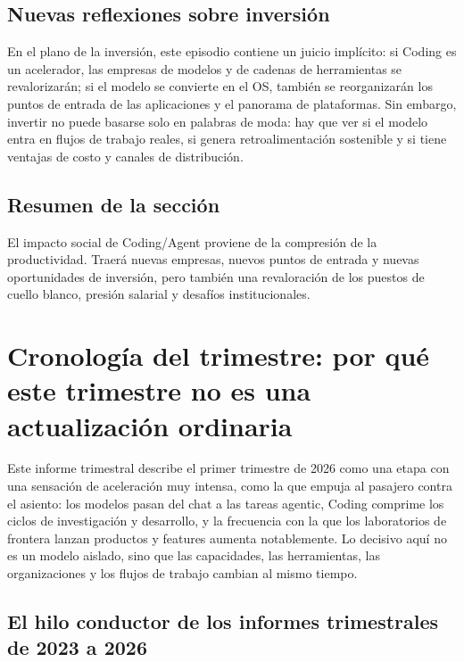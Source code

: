 \documentclass[a4paper]{article}
\begin{document}
\subsection{Nuevas reflexiones sobre inversión}

En el plano de la inversión, este episodio contiene un juicio implícito: si Coding es un acelerador, las empresas de modelos y de cadenas de herramientas se revalorizarán; si el modelo se convierte en el OS, también se reorganizarán los puntos de entrada de las aplicaciones y el panorama de plataformas. Sin embargo, invertir no puede basarse solo en palabras de moda: hay que ver si el modelo entra en flujos de trabajo reales, si genera retroalimentación sostenible y si tiene ventajas de costo y canales de distribución.

\subsection{Resumen de la sección}

El impacto social de Coding/Agent proviene de la compresión de la productividad. Traerá nuevas empresas, nuevos puntos de entrada y nuevas oportunidades de inversión, pero también una revaloración de los puestos de cuello blanco, presión salarial y desafíos institucionales.
\section{Cronología del trimestre: por qué este trimestre no es una actualización ordinaria}

Este informe trimestral describe el primer trimestre de 2026 como una etapa con una sensación de aceleración muy intensa, como la que empuja al pasajero contra el asiento: los modelos pasan del chat a las tareas agentic, Coding comprime los ciclos de investigación y desarrollo, y la frecuencia con la que los laboratorios de frontera lanzan productos y features aumenta notablemente. Lo decisivo aquí no es un modelo aislado, sino que las capacidades, las herramientas, las organizaciones y los flujos de trabajo cambian al mismo tiempo.

\subsection{El hilo conductor de los informes trimestrales de 2023 a 2026}
\end{document}
